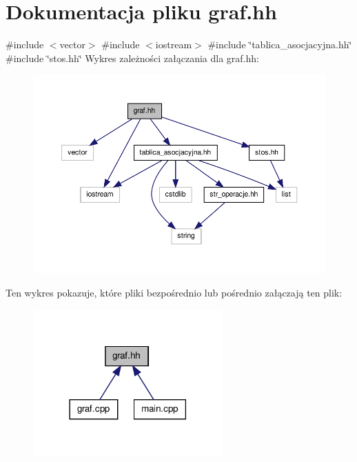 \hypertarget{graf_8hh}{\section{\-Dokumentacja pliku graf.\-hh}
\label{graf_8hh}
}
{\ttfamily \#include $<$vector$>$}\*
{\ttfamily \#include $<$iostream$>$}\*
{\ttfamily \#include \char`\"{}tablica\-\_\-asocjacyjna.\-hh\char`\"{}}\*
{\ttfamily \#include \char`\"{}stos.\-hh\char`\"{}}\*
\-Wykres zależności załączania dla graf.\-hh\-:\nopagebreak
\begin{figure}[H]
\begin{center}
\leavevmode
\includegraphics[width=350pt]{graf_8hh__incl}
\end{center}
\end{figure}
\-Ten wykres pokazuje, które pliki bezpośrednio lub pośrednio załączają ten plik\-:\nopagebreak
\begin{figure}[H]
\begin{center}
\leavevmode
\includegraphics[width=206pt]{graf_8hh__dep__incl}
\end{center}
\end{figure}
